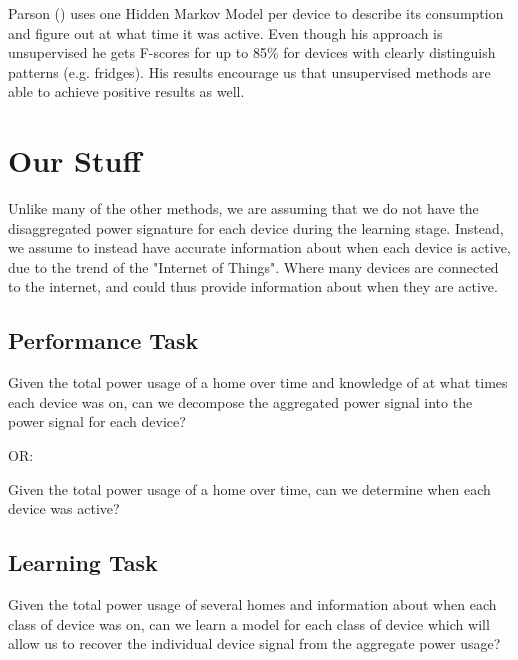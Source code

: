 \documentclass{article}
\begin{document}
Parson () uses one Hidden Markov Model per device to describe its consumption and figure out at what time it was active. Even though his approach is unsupervised he gets F-scores for up to 85\% for devices with clearly distinguish patterns (e.g. fridges). His results encourage us that unsupervised methods are able to achieve positive results as well. 	

\section{Our Stuff}

Unlike many of the other methods, we are assuming that we do not have the disaggregated power signature for each device during the learning stage. Instead, we assume to instead have accurate information about when each device is active, due to the trend of the "Internet of Things". Where many devices are connected to the internet, and could thus provide information about when they are active.

\subsection{Performance Task}

Given the total power usage of a home over time and knowledge of at what times each device was on, can we decompose the aggregated power signal into the power signal for each device?

OR:

Given the total power usage of a home over time, can we determine when each device was active?



\subsection{Learning Task}

Given the total power usage of several homes and information about when each class of device was on, can we learn a model for each class of device which will allow us to recover the individual device signal from the aggregate power usage?




\end{document}
